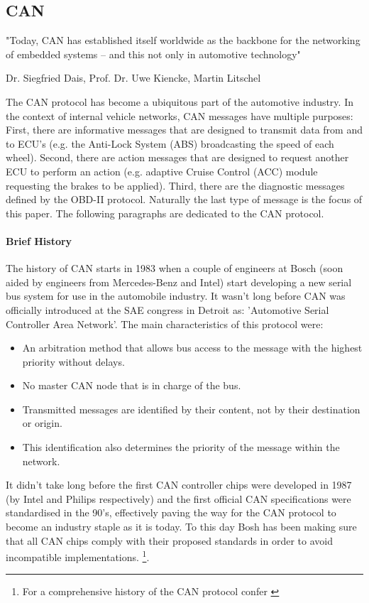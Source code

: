 \documentclass[11pt]{article}
\begin{document}
\subsection{CAN}
\label{sec:can}


\epigraph{"Today, CAN has established itself worldwide as the backbone for the networking of embedded systems – and this not only in automotive technology"}{Dr. Siegfried Dais, Prof. Dr. Uwe Kiencke, Martin Litschel}


The CAN protocol has become a ubiquitous part of the automotive industry. In the context of internal vehicle networks, CAN messages have multiple purposes: First, there are informative messages that are designed to transmit data from and to ECU’s (e.g. the Anti-Lock System (ABS) broadcasting the speed of each wheel). Second, there are action messages that are designed to request another ECU to perform an action (e.g. adaptive Cruise Control (ACC) module requesting the brakes to be applied). Third, there are the diagnostic messages defined by the OBD-II protocol. \cite{MillerB} Naturally the last type of message is the focus of this paper. The following paragraphs are dedicated to the CAN protocol.

\paragraph{Brief History} 

The history of CAN starts in 1983 when a couple of engineers at Bosch (soon aided by engineers from Mercedes-Benz and Intel) start developing a new serial bus system for use in the automobile industry. It wasn't long before CAN was officially introduced at the SAE congress in Detroit as: 'Automotive Serial Controller Area Network'. The main characteristics of this protocol were: 

\begin{itemize}
	\item An arbitration method that allows bus access to the message with the highest priority without delays.
	\item No master CAN node that is in charge of the bus.
	\item Transmitted messages are identified by their content, not by their destination or origin.
	\item This identification also determines the priority of the message within the network.
\end{itemize}

It didn't take long before the first CAN controller chips were developed in 1987 (by Intel and Philips respectively) and the first official CAN specifications were standardised in the 90's, effectively paving the way for the CAN protocol to become an industry staple as it is today. To this day Bosh has been making sure that all CAN chips comply with their proposed standards in order to avoid incompatible implementations. \footnote{For a comprehensive history of the CAN protocol confer \cite{CANhistory}}.
\end{document}
